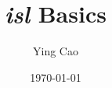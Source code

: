 \documentclass {article}
\title{\textit{isl} Basics}
\author{Ying Cao}
\date{\today}
\begin{document}
\maketitle
\tableofcontents
\newpage


{
\small
\raggedright

\begin{spacing}{1}

\end{spacing}
}
\end{document}

